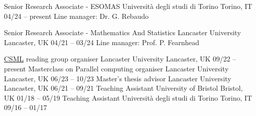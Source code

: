 


\begin{cventries}

  \cventry
    {Senior Research Associate - ESOMAS}
    {Università degli studi di Torino}
    {Torino, IT}
    {04\slash 24 -- present}
    {Line manager: Dr. G. Rebaudo}
    
  \cventry
    {Senior Research Associate - Mathematics And Statistics}
    {Lancaster University}
    {Lancaster, UK}
    {04\slash 21 -- 03\slash 24}
    {Line manager: Prof. P. Fearnhead}
    
  \cventry
    {\href{https://lu-csml.github.io/}{CSML} reading group organiser}
    {Lancaster University} 
    {Lancaster, UK}
    {09\slash 22 -- present}
    {}
    \vspace{-0.25cm}    
  \cventry
    {Masterclass on Parallel computing organiser}
    {Lancaster University} 
    {Lancaster, UK}
    {06\slash 23 -- 10\slash 23}
    {}
    \vspace{-0.25cm}
  \cventry
    {Master's thesis advisor}
    {Lancaster University} 
    {Lancaster, UK}
    {06\slash 21 -- 09\slash 21}
    {}
    \vspace{-0.25cm}
  \cventry
	{Teaching Assistant}
	{University of Bristol}
    {Bristol, UK}
	{01\slash 18 -- 05\slash 19}
    {}
    \vspace{-0.25cm}
  \cventry
	{Teaching Assistant}
	{Università degli studi di Torino}
    {Torino, IT}
	{09\slash 16 -- 01\slash 17}
    {}
    \vspace{-0.25cm}
\end{cventries}
